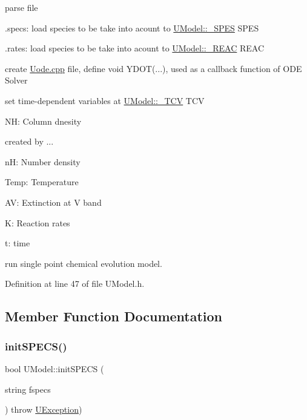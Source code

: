 \begin{DoxyItemize}
\item parse file
\begin{DoxyItemize}
\item .specs\+: load species to be take into acount to \hyperlink{structUModel_1_1__SPES}{U\+Model\+::\+\_\+\+S\+P\+ES} S\+P\+ES
\item .rates\+: load species to be take into acount to \hyperlink{structUModel_1_1__REAC}{U\+Model\+::\+\_\+\+R\+E\+AC} R\+E\+AC
\end{DoxyItemize}
\item create \hyperlink{Uode_8cpp_source}{Uode.\+cpp} file, define void Y\+D\+OT(...), used as a callback function of O\+DE Solver
\item set time-\/dependent variables at \hyperlink{structUModel_1_1__TCV}{U\+Model\+::\+\_\+\+T\+CV} T\+CV
\begin{DoxyItemize}
\item NH\+: Column dnesity
\begin{DoxyItemize}
\item created by ...
\end{DoxyItemize}
\item nH\+: Number density
\item Temp\+: Temperature
\item AV\+: Extinction at V band
\item K\+: Reaction rates
\item t\+: time
\end{DoxyItemize}
\item run single point chemical evolution model. 
\end{DoxyItemize}

Definition at line 47 of file U\+Model.\+h.



\subsection{Member Function Documentation}
\mbox{\label{classUModel_a29ccc1ecbbd13a3fed4d91395691553b}} 
\subsubsection{\texorpdfstring{init\+S\+P\+E\+C\+S()}{initSPECS()}}
{\footnotesize\ttfamily bool U\+Model\+::init\+S\+P\+E\+CS (\begin{DoxyParamCaption}\item[{string}]{fspecs }\end{DoxyParamCaption}) throw  \hyperlink{classUException}{U\+Exception}) }


